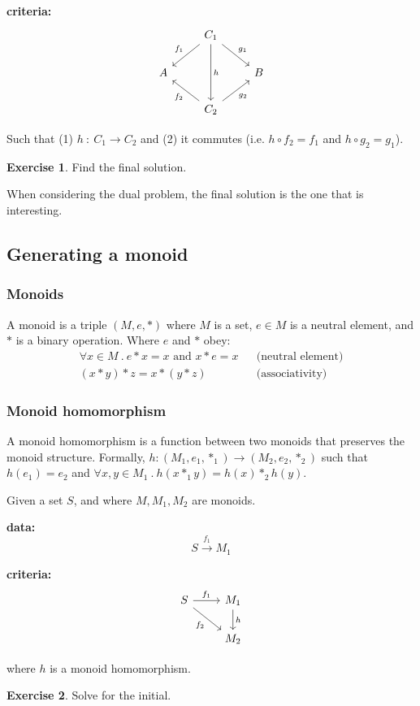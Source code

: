\documentclass[a4paper, 12pt]{article}
\theoremstyle{definition}
\newtheorem{exercise}{Exercise}
\begin{document}
\textbf{criteria:}
$$
\begin{tikzcd}
    {} & C_1 \arrow[dd, "h"] \arrow[ld, swap, "f_1"] \arrow[rd, "g_1"] & {} \\
    A & {} & B \\
    {} & C_2 \arrow[lu, "f_2"] \arrow[ru, swap, "g_2"] & {}
\end{tikzcd}
$$

Such that (1) $h\ :\ C_1 \rightarrow C_2$ and (2) it commutes (i.e. $h \circ f_2 = f_1$
and $h \circ g_2 = g_1$).

\begin{exercise}
    Find the final solution.
\end{exercise}

When considering the dual problem, the final solution is the one that is
interesting.

\subsection{Generating a monoid}

\subsubsection*{Monoids}

A monoid is a triple $(M, e, \ast)$ where $M$ is a set, $e \in M$ is a neutral
element, and $\ast$ is a binary operation. Where $e$ and $\ast$ obey:
\begin{align*}
    \forall x \in M\ .\ e \ast x = x \text{ and } x \ast e = x && \text{(neutral
    element)} \\
    (x \ast y) \ast z = x \ast (y \ast z) && \text{(associativity)}
\end{align*}

\subsubsection*{Monoid homomorphism}
A monoid homomorphism is a function between two monoids that preserves the
monoid structure. Formally, $h : (M_1, e_1, \ast_1)
\rightarrow (M_2, e_2, \ast_2)$ such that $h(e_1) = e_2$ and $\forall x, y \in
M_1\ .\ h(x \ast_1 y) = h(x) \ast_2 h(y)$.

Given a set $S$, and where $M, M_1, M_2$ are monoids.

\textbf{data:}
$$S \overset{f_1}{\rightarrow}M_1$$

\textbf{criteria:}
$$
\begin{tikzcd}
    S \arrow[r, "f_1"] \arrow[dr, swap, "f_2"] & M_1 \arrow[d, "h"] \\
    {} & M_2
\end{tikzcd}
$$

where $h$ is a monoid homomorphism.

\begin{exercise}
    Solve for the initial.
\end{exercise}
\end{document}
